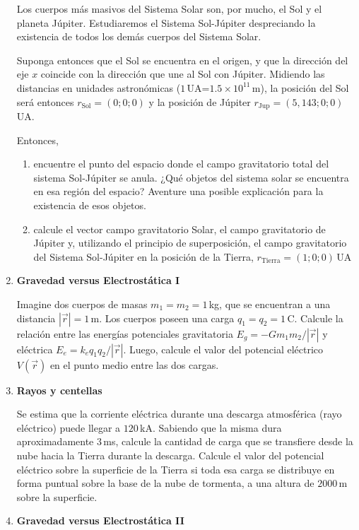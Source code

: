 \documentclass[a4paper,12pt]{article}
\begin{document}
\begin{enumerate}
Los cuerpos más masivos del Sistema Solar son, por mucho, el Sol y el planeta
Júpiter. Estudiaremos el Sistema Sol-Júpiter despreciando la existencia de
todos los demás cuerpos del Sistema Solar. 

Suponga entonces que el Sol se encuentra en el origen, y que la dirección del
eje $x$ coincide con la dirección que une al Sol con Júpiter. Midiendo las
distancias en unidades astronómicas ($1$\,UA=$1.5\times10^{11}$\,m), la
posición del Sol será entonces $r_{\mathrm{Sol}} = (0; 0; 0)$ y la posición de Júpiter
$r_\mathrm{Jup} = (5,143; 0; 0)$\,UA. 

Entonces, 
\begin{enumerate}
  \item encuentre el punto del espacio donde el campo gravitatorio total del sistema Sol-Júpiter se anula. ¿Qué objetos del sistema solar se encuentra en esa región del espacio? Aventure una posible explicación para la existencia de esos objetos.
  \item calcule el vector campo gravitatorio Solar, el campo gravitatorio de Júpiter y, utilizando el principio de superposición, el campo gravitatorio del Sistema Sol-Júpiter en la posición de la Tierra, $r_\mathrm{Tierra} = (1; 0; 0)$\,UA
\end{enumerate}

\item {\bf{Gravedad versus Electrostática I}} %

Imagine dos cuerpos de masas $m_1=m_2=1$\,kg, que se encuentran a una distancia
$|\vec{r}|=1$\,m. Los cuerpos poseen una carga $q_1=q_2=1$\,C. Calcule la
relación entre las energías potenciales gravitatoria $E_g= -G m_1 m_2 /
|\vec{r}|$ y eléctrica $E_e= k_e q_1 q_2 / |\vec{r}|$. Luego, calcule el
valor del potencial eléctrico $V(\vec{r})$ en el punto medio entre las dos
cargas.

\item {\bf{Rayos y centellas}}

Se estima que la corriente eléctrica durante una descarga atmosférica (rayo
eléctrico) puede llegar a $120$\,kA. Sabiendo que la misma dura aproximadamente
$3$\,ms, calcule la cantidad de carga que se transfiere desde la nube hacia la
Tierra durante la descarga. Calcule el valor del potencial eléctrico sobre la
superficie de la Tierra si toda esa carga se distribuye en forma puntual sobre
la base de la nube de tormenta, a una altura de $2000$\,m sobre la superficie.

\item {\bf{Gravedad versus Electrostática II}}


\end{enumerate}
\end{document}
